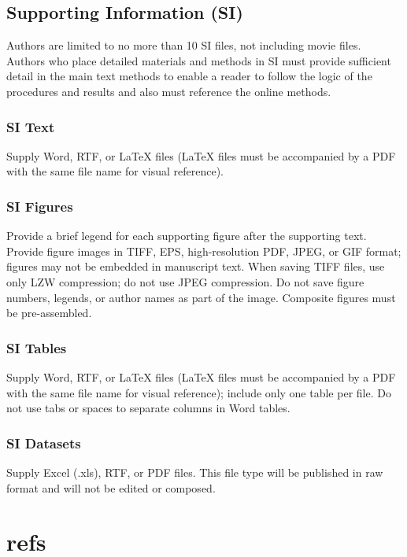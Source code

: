 \documentclass[9pt,twocolumn,twoside,lineno]{pnas-new}
\begin{document}
\hypertarget{supporting-information-si}{%
\subsection*{Supporting Information
(SI)}\label{supporting-information-si}}

Authors are limited to no more than 10 SI files, not including movie
files. Authors who place detailed materials and methods in SI must
provide sufficient detail in the main text methods to enable a reader to
follow the logic of the procedures and results and also must reference
the online methods.

\hypertarget{si-text}{%
\subsubsection*{SI Text}\label{si-text}}

Supply Word, RTF, or LaTeX files (LaTeX files must be accompanied by a
PDF with the same file name for visual reference).

\hypertarget{si-figures}{%
\subsubsection*{SI Figures}\label{si-figures}}

Provide a brief legend for each supporting figure after the supporting
text. Provide figure images in TIFF, EPS, high-resolution PDF, JPEG, or
GIF format; figures may not be embedded in manuscript text. When saving
TIFF files, use only LZW compression; do not use JPEG compression. Do
not save figure numbers, legends, or author names as part of the image.
Composite figures must be pre-assembled.

\hypertarget{si-tables}{%
\subsubsection*{SI Tables}\label{si-tables}}

Supply Word, RTF, or LaTeX files (LaTeX files must be accompanied by a
PDF with the same file name for visual reference); include only one
table per file. Do not use tabs or spaces to separate columns in Word
tables.

\hypertarget{si-datasets}{%
\subsubsection*{SI Datasets}\label{si-datasets}}

Supply Excel (.xls), RTF, or PDF files. This file type will be published
in raw format and will not be edited or composed.

\showmatmethods
\showacknow
\pnasbreak

\hypertarget{refs}{%
\section*{refs}\label{refs}}



% 
\end{document}

